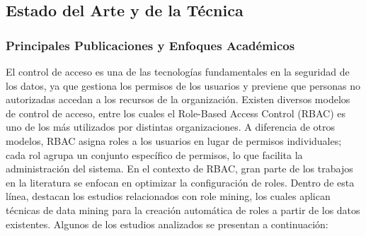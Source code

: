 \documentclass[11pt,letterpaper]{article}
\begin{document}
\subsection{Estado del Arte y de la Técnica}

\subsubsection{Principales Publicaciones y Enfoques Académicos}

El control de acceso es una de las tecnologías fundamentales en la seguridad de los datos, ya que gestiona los permisos de los usuarios y previene que personas no autorizadas accedan a los recursos de la organización. Existen diversos modelos de control de acceso, entre los cuales el Role-Based Access Control (RBAC) es uno de los más utilizados por distintas organizaciones. A diferencia de otros modelos, RBAC asigna roles a los usuarios en lugar de permisos individuales; cada rol agrupa un conjunto específico de permisos, lo que facilita la administración del sistema.
En el contexto de RBAC, gran parte de los trabajos en la literatura se enfocan en optimizar la configuración de roles. Dentro de esta línea, destacan los estudios relacionados con role mining, los cuales aplican técnicas de data mining para la creación automática de roles a partir de los datos existentes. Algunos de los estudios analizados se presentan a continuación:
\end{document}
